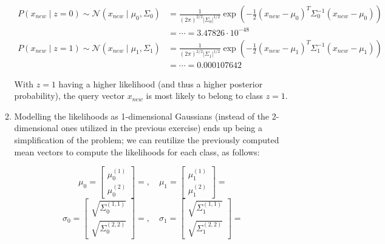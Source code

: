 \documentclass[12pt]{article}
\begin{document}
\begin{enumerate}[leftmargin=\labelsep]
\begin{enumerate}
{                \begin{align*}
                  P(x_{new} \mid z = 0) \sim \mathcal{N}(x_{new} \mid \mu_0, \Sigma_0)
                   & = \frac{1}{(2\pi)^{2/2}|\Sigma_0|^{1/2}}
                  \exp\left(-\frac{1}{2}(x_{new} - \mu_0)^T \Sigma_0^{-1}(x_{new} - \mu_0)\right) \\
                   & = \cdots = 3.47826 \cdot 10^{-48}                                            \\
                  P(x_{new} \mid z = 1) \sim \mathcal{N}(x_{new} \mid \mu_1, \Sigma_1)
                   & = \frac{1}{(2\pi)^{2/2}|\Sigma_1|^{1/2}}
                  \exp\left(-\frac{1}{2}(x_{new} - \mu_1)^T \Sigma_1^{-1}(x_{new} - \mu_1)\right) \\
                   & = \cdots = 0.000107642
                \end{align*}
                }

                With $z=1$ having a higher likelihood (and thus a higher posterior probability),
                the query vector $x_{new}$ is most likely to belong to class $z=1$.
          \item {
                Modelling the likelihoods as 1-dimensional Gaussians (instead of the 2-dimensional
                ones utilized in the previous exercise) ends up being a simplification of the
                problem; we can reutilize the previously computed mean vectors
                to compute the likelihoods for each class, as follows:

                $$
                  \mu_0 = \begin{bmatrix}
                    \mu_0^{(1)} \\
                    \mu_0^{(2)}
                  \end{bmatrix} = , \quad
                  \mu_1 = \begin{bmatrix}
                    \mu_1^{(1)} \\
                    \mu_1^{(2)}
                  \end{bmatrix} = 
                $$
                $$
                  \sigma_0 = \begin{bmatrix}
                    \sqrt{\Sigma_0^{(1, 1)}} \\
                    \sqrt{\Sigma_0^{(2, 2)}}
                  \end{bmatrix} = , \quad
                  \sigma_1 = \begin{bmatrix}
                    \sqrt{\Sigma_1^{(1, 1)}} \\
                    \sqrt{\Sigma_1^{(2, 2)}}
                  \end{bmatrix} = 
                $$

}
\end{enumerate}
\end{enumerate}
\end{document}
